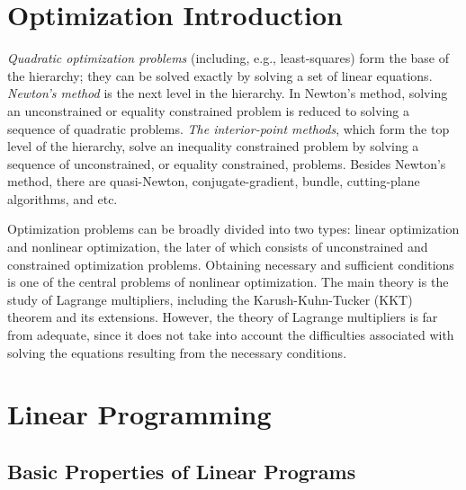 \chapter{Optimization Introduction}
{\em{Quadratic optimization problems}} (including, e.g., least-squares) form the base of the hierarchy; they can be solved exactly by solving a set of linear equations. {\em{Newton's method}} is the next level in the hierarchy. In Newton's method, solving an unconstrained or equality constrained problem is reduced to solving a sequence of quadratic problems. {\em{The interior-point methods}}, which form the top level of the hierarchy, solve an inequality constrained problem by solving a sequence of unconstrained, or equality constrained, problems. Besides Newton's method, there are quasi-Newton, conjugate-gradient, bundle, cutting-plane algorithms, and etc.

Optimization problems can be broadly divided into two types: linear optimization and nonlinear optimization,  the later of which consists of unconstrained and constrained optimization problems. Obtaining necessary and sufficient conditions is one of the central problems of nonlinear optimization. The main theory is the study of Lagrange multipliers, including the Karush-Kuhn-Tucker (KKT) theorem and its extensions. However, the theory of Lagrange multipliers is far from adequate, since it does not take into account the difficulties associated with solving the equations resulting from the necessary conditions.


\chapter{Linear Programming}
\section{Basic Properties of Linear Programs}

